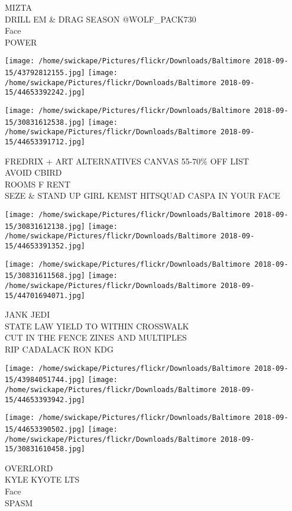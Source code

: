 \documentclass[10pt,letterpaper]{article}
\begin{document}
MIZTA\\
DRILL EM \& DRAG SEASON @WOLF\_PACK730\\
Face\\
POWER\\
\pagebreak

\texttt{[image: /home/swickape/Pictures/flickr/Downloads/Baltimore 2018-09-15/43792812155.jpg]}
\texttt{[image: /home/swickape/Pictures/flickr/Downloads/Baltimore 2018-09-15/44653392242.jpg]}

\texttt{[image: /home/swickape/Pictures/flickr/Downloads/Baltimore 2018-09-15/30831612538.jpg]}
\texttt{[image: /home/swickape/Pictures/flickr/Downloads/Baltimore 2018-09-15/44653391712.jpg]}

FREDRIX + ART ALTERNATIVES CANVAS 55{-}70\% OFF LIST\\
AVOID CBIRD\\
ROOMS F RENT\\
SEZE \& STAND UP GIRL KEMST HITSQUAD CASPA IN YOUR FACE\\
\pagebreak

\texttt{[image: /home/swickape/Pictures/flickr/Downloads/Baltimore 2018-09-15/30831612138.jpg]}
\texttt{[image: /home/swickape/Pictures/flickr/Downloads/Baltimore 2018-09-15/44653391352.jpg]}

\texttt{[image: /home/swickape/Pictures/flickr/Downloads/Baltimore 2018-09-15/30831611568.jpg]}
\texttt{[image: /home/swickape/Pictures/flickr/Downloads/Baltimore 2018-09-15/44701694071.jpg]}

JANK JEDI\\
STATE LAW YIELD TO WITHIN CROSSWALK\\
CUT IN THE FENCE ZINES AND MULTIPLES\\
RIP CADALACK RON KDG\\
\pagebreak

\texttt{[image: /home/swickape/Pictures/flickr/Downloads/Baltimore 2018-09-15/43984051744.jpg]}
\texttt{[image: /home/swickape/Pictures/flickr/Downloads/Baltimore 2018-09-15/44653393942.jpg]}

\texttt{[image: /home/swickape/Pictures/flickr/Downloads/Baltimore 2018-09-15/44653390502.jpg]}
\texttt{[image: /home/swickape/Pictures/flickr/Downloads/Baltimore 2018-09-15/30831610458.jpg]}

OVERLORD\\
KYLE KYOTE LTS\\
Face\\
SPASM\\
\pagebreak
\end{document}
